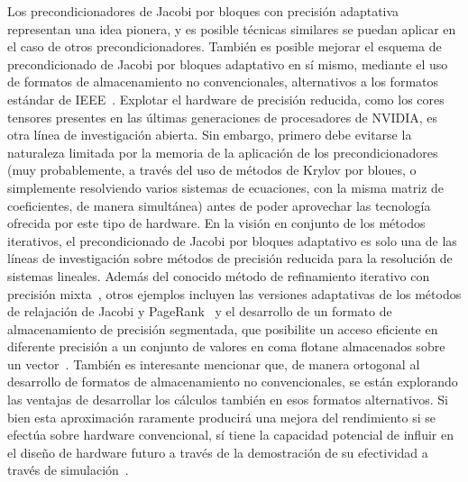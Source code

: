 Los precondicionadores de Jacobi por bloques con precisión adaptativa
representan una idea pionera, y es posible técnicas similares se puedan aplicar
en el caso de otros precondicionadores.  También es posible mejorar el esquema
de precondicionado de Jacobi por bloques adaptativo en sí mismo, mediante el uso
de formatos de almacenamiento no convencionales, alternativos a los formatos
estándar de IEEE~\cite{adaptive-jacobi-gpu}.  Explotar el hardware de precisión
reducida, como los cores tensores presentes en las últimas generaciones de
procesadores de NVIDIA, es otra línea de investigación abierta.  Sin embargo,
primero debe evitarse la naturaleza limitada por la memoria de la aplicación de
los precondicionadores (muy probablemente, a través del uso de métodos de Krylov
por bloues, o simplemente resolviendo varios sistemas de ecuaciones, con la
misma matriz de coeficientes, de manera simultánea) antes de poder aprovechar
las tecnología ofrecida por este tipo de hardware.  En la visión en conjunto de
los métodos iterativos, el precondicionado de Jacobi por bloques adaptativo es
solo una de las líneas de investigación sobre métodos de precisión reducida para
la resolución de sistemas lineales. Además del conocido método de refinamiento
iterativo con precisión mixta~\cite{higham-ir}, otros ejemplos incluyen las
versiones adaptativas de los métodos de relajación de Jacobi y
PageRank~\cite{jacobi,jacobi-modular,pagerank} y el desarrollo de un formato de
almacenamiento de precisión segmentada, que posibilite un acceso eficiente en
diferente precisión a un conjunto de valores en coma flotane almacenados sobre
un vector~\cite{jacobi-modular,pagerank,anzt-ir}. También es interesante
mencionar que, de manera ortogonal al desarrollo de formatos de almacenamiento
no convencionales, se están explorando las ventajas de desarrollar los cálculos
también en esos formatos alternativos.  Si bien esta aproximación raramente
producirá una mejora del rendimiento si se efectúa sobre hardware convencional,
sí tiene la capacidad potencial de influir en el diseño de hardware futuro a
través de la demostración de su efectividad a través de simulación~\cite{floatx,
flexfloat}.


